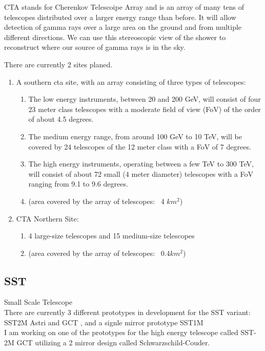 \documentclass[article,type=pp,colorback,accentcolor=tud9c]{tudthesis}
\begin{document}
CTA stands for Cherenkov Telescoipe Array and is an array of many tens of telescopes distributed over a larger energy range than before. It will allow detection of gamma rays over a large area on the ground and from multiple different directions. We can use this stereoscopic view of the shower to reconstruct where our source of gamma rays is in the sky.
	\newline 	

	There are currently 2 sites planed. 	
	\begin{enumerate}
	\item A southern cta site, with an array consisting of three types of telescopes:\\
		\begin{enumerate}
		\item The low energy instruments, between 20 and 200 GeV, will consist of four 23 meter class telescopes with a moderate field of view (FoV) of the order of about 4.5 degrees.
		\item The medium energy range, from around 100 GeV to 10 TeV, will be covered by 24 telescopes of the 12 meter class with a FoV of 7 degrees.
		\item The high energy instruments, operating between a few TeV to 300 TeV, will consist of about 72 small (4 meter diameter) telescopes with a FoV ranging from 9.1 to 9.6 degrees.
		\item  (area covered by the array of telescopes: ~4 $km^2$)\\
		\end{enumerate}
	\item CTA Northern Site:
		\begin{enumerate} 
		\item 4 large-size telescopes and 15 medium-size telescopes
		\item (area covered by the array of telescopes: ~0.4$ km^2$)
		\end{enumerate}
	\end{enumerate}
    \subsection{SST}
    
    Small Scale Telescope\\
    There are currently 3 different prototypes in development for the SST variant: SST2M Astri and GCT , and a signle mirror prototype SST1M\\
     I am working on one of the prototypes for the high energy telescope called SST-2M GCT utilizing a 2 mirror design called Schwarzschild-Couder.
     
\end{document}
